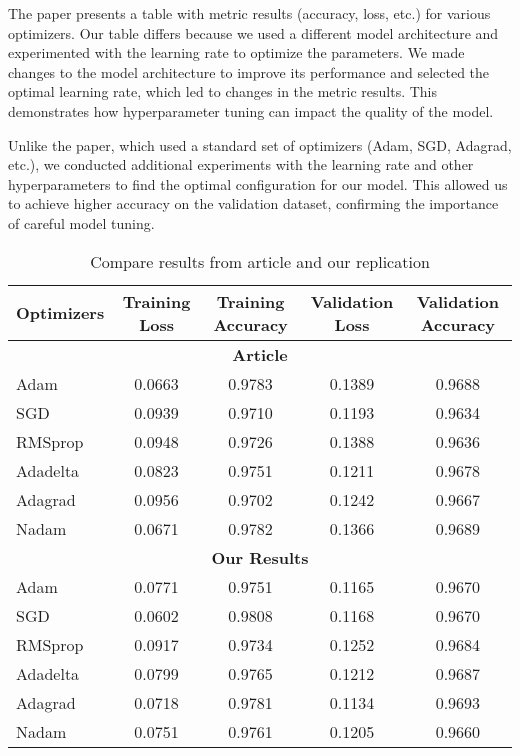 \documentclass[journal,onecolumn]{IEEEtran}
\begin{document}
The paper presents a table with metric results (accuracy, loss, etc.) for various optimizers. Our table differs because we used a different model architecture and experimented with the learning rate to optimize the parameters. We made changes to the model architecture to improve its performance and selected the optimal learning rate, which led to changes in the metric results. This demonstrates how hyperparameter tuning can impact the quality of the model.

Unlike the paper, which used a standard set of optimizers (Adam, SGD, Adagrad, etc.), we conducted additional experiments with the learning rate and other hyperparameters to find the optimal configuration for our model. This allowed us to achieve higher accuracy on the validation dataset, confirming the importance of careful model tuning.

\begin{table}[h!]
\centering
\begin{tabular}{lcccc}
\toprule
Optimizers & Training Loss & Training Accuracy & Validation Loss & Validation Accuracy \\
\midrule
\multicolumn{5}{c}{\textbf{Article}} \\
\midrule
Adam & 0.0663 & 0.9783 & 0.1389 & 0.9688 \\
SGD & 0.0939 & 0.9710 & 0.1193 & 0.9634 \\
RMSprop & 0.0948 & 0.9726 & 0.1388 & 0.9636 \\
Adadelta & 0.0823 & 0.9751 & 0.1211 & 0.9678 \\
Adagrad & 0.0956 & 0.9702 & 0.1242 & 0.9667 \\
Nadam & 0.0671 & 0.9782 & 0.1366 & 0.9689 \\
\midrule
\multicolumn{5}{c}{\textbf{Our Results}} \\
\midrule
Adam & 0.0771 & 0.9751 & 0.1165 & 0.9670 \\
SGD & 0.0602 & 0.9808 & 0.1168 & 0.9670 \\
RMSprop & 0.0917 & 0.9734 & 0.1252 & 0.9684 \\
Adadelta & 0.0799 & 0.9765 & 0.1212 & 0.9687 \\
Adagrad & 0.0718 & 0.9781 & 0.1134 & 0.9693 \\
Nadam & 0.0751 & 0.9761 & 0.1205 & 0.9660 \\
\bottomrule
\end{tabular}
\caption{Compare results from article and our replication}
\label{tab:comparison}
\end{table}
\end{document}
